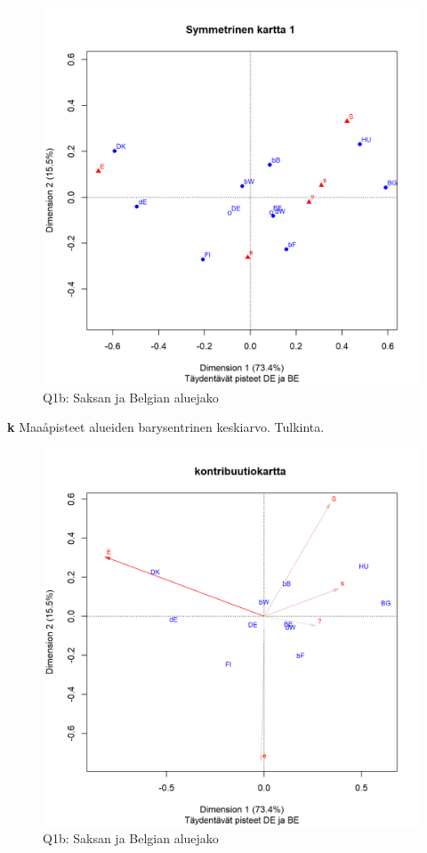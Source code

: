 \documentclass[
  finnish,
]{book}
\begin{document}
\begin{figure}

{\centering \includegraphics[width=0.9\linewidth]{JH_capaper_files/figure-latex/suppointCA2map1-1} 

}

\caption{Q1b: Saksan ja  Belgian aluejako }\label{fig:suppointCA2map1}
\end{figure}

\textbf{k} Maaåpisteet alueiden barysentrinen keskiarvo. Tulkinta.

\begin{figure}

{\centering \includegraphics[width=0.9\linewidth]{JH_capaper_files/figure-latex/suppointCA2map2-1} 

}

\caption{Q1b: Saksan ja  Belgian aluejako }\label{fig:suppointCA2map2}
\end{figure}
\end{document}
